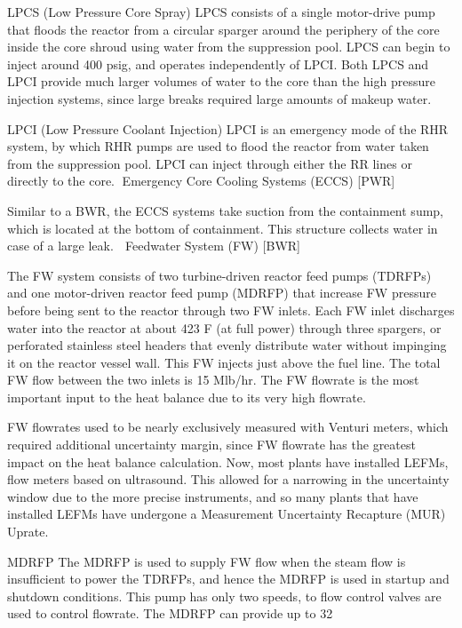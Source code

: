 \documentclass[10pt]{article}
\begin{document}
LPCS (Low Pressure Core Spray)
LPCS consists of a single motor-drive pump that floods the reactor from a circular sparger around the periphery of the core inside the core shroud using water from the suppression pool. LPCS can begin to inject around 400 psig, and operates independently of LPCI. Both LPCS and LPCI provide much larger volumes of water to the core than the high pressure injection systems, since large breaks required large amounts of makeup water. 

LPCI (Low Pressure Coolant Injection)
LPCI is an emergency mode of the RHR system, by which RHR pumps are used to flood the reactor from water taken from the suppression pool. LPCI can inject through either the RR lines or directly to the core.
Emergency Core Cooling Systems (ECCS) [PWR]

Similar to a BWR, the ECCS systems take suction from the containment sump, which is located at the bottom of containment. This structure collects water in case of a large leak. 
Feedwater System (FW) [BWR]

The FW system consists of two turbine-driven reactor feed pumps (TDRFPs) and one motor-driven reactor feed pump (MDRFP) that increase FW pressure before being sent to the reactor through two FW inlets. Each FW inlet discharges water into the reactor at about 423 F (at full power) through three spargers, or perforated stainless steel headers that evenly distribute water without impinging it on the reactor vessel wall. This FW injects just above the fuel line. The total FW flow between the two inlets is 15 Mlb/hr. The FW flowrate is the most important input to the heat balance due to its very high flowrate.

FW flowrates used to be nearly exclusively measured with Venturi meters, which required additional uncertainty margin, since FW flowrate has the greatest impact on the heat balance calculation. Now, most plants have installed LEFMs, flow meters based on ultrasound. This allowed for a narrowing in the uncertainty window due to the more precise instruments, and so many plants that have installed LEFMs have undergone a Measurement Uncertainty Recapture (MUR) Uprate. 

MDRFP
The MDRFP is used to supply FW flow when the steam flow is insufficient to power the TDRFPs, and hence the MDRFP is used in startup and shutdown conditions. This pump has only two speeds, to flow control valves are used to control flowrate. The MDRFP can provide up to 32%
\end{document}
